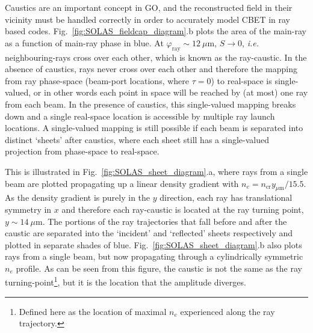 Caustics are an important concept in \ac{GO}, and the reconstructed field in their vicinity must be handled correctly in order to accurately model \ac{CBET} in ray based codes.
Fig.~\ref{fig:SOLAS_fieldcap_diagram}.b plots the area of the main-ray as a function of main-ray phase in blue.
At $\varphi_{\text{ray}}\sim12\ \mu\text{m}$, $S\rightarrow 0$, \textit{i.e.} neighbouring-rays cross over each other, which is known as the ray-caustic.
In the absence of caustics, rays never cross over each other and therefore the mapping from ray phase-space (beam-port locations, where $\tau=0$) to real-space is single-valued, or in other words each point in space will be reached by (at most) one ray from each beam.
In the presence of caustics, this single-valued mapping breaks down and a single real-space location is accessible by multiple ray launch locations.
A single-valued mapping is still possible if each beam is separated into distinct `sheets' after caustics, where each sheet still has a single-valued projection from phase-space to real-space.

This is illustrated in Fig.~\ref{fig:SOLAS_sheet_diagram}.a, where rays from a single beam are plotted propagating up a linear density gradient with $n_e=n_{\text{cr}}y_{\mu\text{m}}/15.5$.
As the density gradient is purely in the $y$ direction, each ray has translational symmetry in $x$ and therefore each ray-caustic is located at the ray turning point, $y\sim14\ \mu\text{m}$.
The portions of the ray trajectories that fall before and after the caustic are separated into the `incident' and `reflected' sheets respectively and plotted in separate shades of blue.
Fig.~\ref{fig:SOLAS_sheet_diagram}.b also plots rays from a single beam, but now propagating through a cylindrically symmetric $n_e$ profile.
As can be seen from this figure, the caustic is not the same as the ray turning-point\footnote{Defined here as the location of maximal $n_e$ experienced along the ray trajectory.}, but it is the location that the amplitude diverges.

